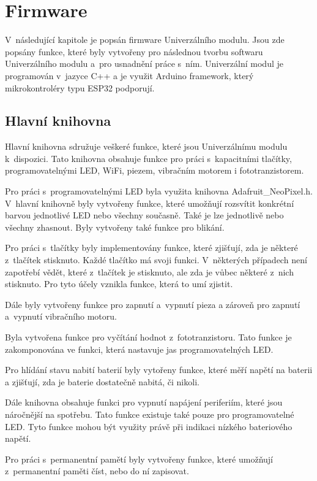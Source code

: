 \chapter{Firmware}
V~následující kapitole je popsán firmware Univerzálního modulu. Jsou zde popsány funkce, které byly vytvořeny pro následnou tvorbu softwaru Univerzálního modulu a~pro usnadnění práce s~ním. Univerzální 
modul je programován v~jazyce C++ a je využit Arduino framework, který mikrokontroléry typu ESP32 podporují.  

\section{Hlavní knihovna}
Hlavní knihovna sdružuje veškeré funkce, které jsou Univerzálnímu modulu k~dispozici. Tato knihovna obsahuje funkce pro práci s~kapacitními tlačítky, programovatelnými LED, WiFi, piezem, vibračním 
motorem i fototranzistorem. 

Pro práci s~programovatelnými LED byla využita knihovna Adafruit\_NeoPixel.h. V~hlavní knihovně byly vytvořeny funkce, které umožňují rozsvítit konkrétní barvou jednotlivé LED nebo všechny současně. Také 
je lze jednotlivě nebo všechny zhasnout. Byly vytvořeny také funkce pro blikání. 

Pro práci s~tlačítky byly implementovány funkce, které zjišťují, zda je některé z~tlačítek stisknuto. Každé tlačítko má svoji funkci. V~některých případech není zapotřebí vědět, které z~tlačítek je stisknuto, 
ale zda je vůbec některé z~nich stisknuto. Pro tyto účely vznikla funkce, která to umí zjistit. 

Dále byly vytvořeny funkce pro zapnutí a~vypnutí pieza a zároveň pro zapnutí a~vypnutí vibračního motoru. 

Byla vytvořena funkce pro vyčítání hodnot z~fototranzistoru. Tato funkce je zakomponována ve funkci, která nastavuje jas programovatelných LED.

Pro hlídání stavu nabití baterií byly vytořeny funkce, které měří napětí na baterii a zjišťují, zda je baterie dostatečně nabitá, či nikoli. 

Dále knihovna obsahuje funkci pro vypnutí napájení periferiím, které jsou náročnější na spotřebu. Tato funkce existuje také pouze pro programovatelné LED. Tyto funkce mohou být využity právě při indikaci 
nízkého bateriového napětí.

Pro práci s~permanentní pamětí byly vytvořeny funkce, které umožňují z~permanentní paměti číst, nebo do ní zapisovat. 

